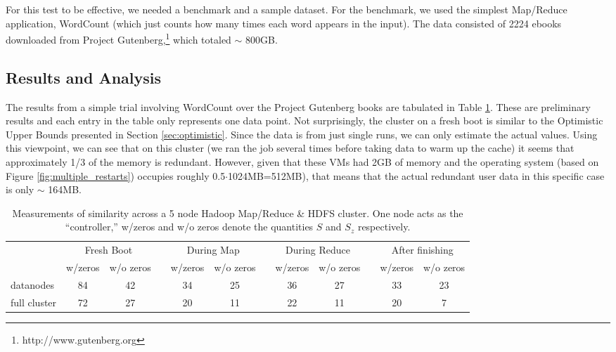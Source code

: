 \documentclass{acm_proc_article-sp}
\begin{document}
For this test to be effective, we needed a benchmark and a sample dataset.  For the benchmark, we used the simplest Map/Reduce application, WordCount (which just counts how many times each word appears in the input).  The data consisted of 2224 ebooks downloaded from Project Gutenberg,\footnote{http://www.gutenberg.org} which totaled $\sim$ 800GB.

\subsection{Results and Analysis}\label{sec:hadoop_results}
The results from a simple trial involving WordCount over the Project Gutenberg books are tabulated in Table \ref{tab:hadoop}.  These are preliminary results and each entry in the table only represents one data point.  Not surprisingly, the cluster on a fresh boot is similar to the Optimistic Upper Bounds presented in Section \ref{sec:optimistic}.  Since the data is from just single runs, we can only estimate the actual values.  Using this viewpoint, we can see that on this cluster (we ran the job several times before taking data to warm up the cache) it seems that approximately 1/3 of the memory is redundant.  However, given that these VMs had 2GB of memory and the operating system (based on Figure \ref{fig:multiple_restarts}) occupies roughly 0.5$\cdot$1024MB=512MB), that means that the actual redundant user data in this specific case is only $\sim$ 164MB.

\begin{table}
  \begin{tabular}{lccccccccccc}
    \toprule
    & \multicolumn{2}{c}{Fresh Boot} && \multicolumn{2}{c}{During Map} && \multicolumn{2}{c}{During Reduce} && \multicolumn{2}{c}{After finishing}\\
    \cmidrule{2-3} \cmidrule{5-6} \cmidrule{8-9} \cmidrule{11-12}
    & w/zeros & w/o zeros && w/zeros & w/o zeros && w/zeros & w/o zeros && w/zeros & w/o zeros\\
    \midrule
      datanodes & 84 & 42 && 34 & 25 && 36 & 27 && 33 & 23\\
      full cluster & 72 & 27 && 20 & 11 &&  22 & 11 && 20 & 7\\
    \bottomrule
  \end{tabular}
  \caption{Measurements of similarity across a 5 node Hadoop Map/Reduce \& HDFS cluster.  One node acts as the ``controller,'' w/zeros and w/o zeros denote the quantities $S$ and $S_z$ respectively.}\label{tab:hadoop}
\end{table}
\end{document}
